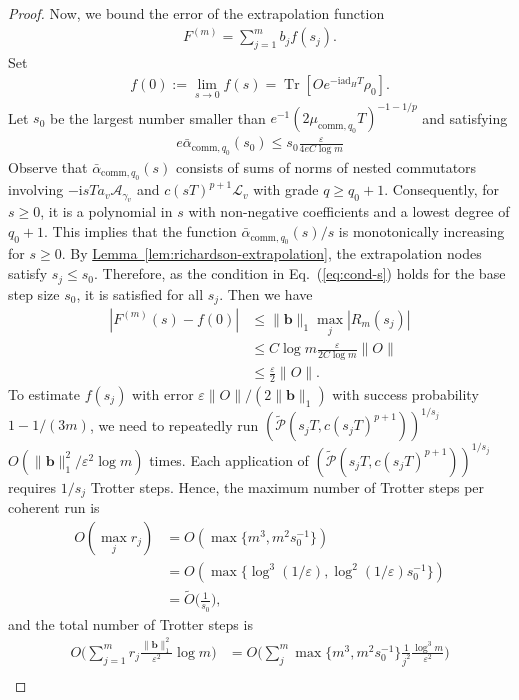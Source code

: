 \documentclass[aps,pra,reprint,groupedaddress,floatfix]{revtex4-2}
\newcommand{\eq}[1]{(\ref{eq:#1})}
\newcommand{\lem}[1]{\hyperref[lem:#1]{Lemma~\ref*{lem:#1}}}
\renewcommand{\i}{\mathrm{i}}
\newcommand{\ad}{\mathrm{ad}}
\newcommand{\eps}{\varepsilon}
\newcommand{\mc}{\mathcal}
\begin{document}
\begin{proof}
    Now, we bound the error of the extrapolation function \begin{align*}
        F^{(m)} = \sum_{j=1}^m b_j f(s_j).
    \end{align*}
    Set \begin{align*}
        f(0) :=\lim_{s\to 0} f(s) = \operatorname{Tr}[Oe^{-\i \ad_H T}\rho_0].
    \end{align*} Let $s_0$ be the largest number smaller than $e^{-1}(2\mu_{\mathrm{comm},q_0}T)^{-1-1/p}$ and satisfying \begin{align*}
        e\bar\alpha_{\mathrm{comm},q_0}(s_0)\le s_0\frac{\eps}{4eC \log m}
    \end{align*}
    Observe that $\bar\alpha_{\mathrm{comm}, q_0}(s)$ consists of sums of norms of nested commutators involving $-\i sT a_v \mc{A}_{\gamma_v}$ and $c(sT)^{p+1} \mc L_{v}$ with grade $q \ge q_0+1$. Consequently, for $s \ge 0$, it is a polynomial in $s$ with non-negative coefficients and a lowest degree of $q_0+1$. This implies that the function $\bar\alpha_{\mathrm{comm}, q_0}(s)/s$ is monotonically increasing for $s \ge 0$. 
    By \lem{richardson-extrapolation}, the extrapolation nodes satisfy $s_j \le s_0$. Therefore, as the condition in Eq.~\eq{cond-s} holds for the base step size $s_0$, it is satisfied for all $s_j$.
    Then we have \begin{align*}
        |F^{(m)}(s)-f(0)|&\le \|\mathbf{b}\|_1 \max_j|R_m(s_j)| \\
        &\le C\log m\frac{\eps}{2C\log m}\|O\|\\
        &\le \frac{\eps }{2}\|O\|.
    \end{align*}
    To estimate $f(s_j)$ with error $\eps\|O\|/(2\|\mathbf{b}\|_1)$ with success probability $1-1/(3m)$, we need to repeatedly run $(\tilde{\mc P}(s_jT, c(s_jT)^{p+1}))^{1/s_j}$ $O(\|\mathbf{b}\|_1^2/\eps^2\log m)$ times.  Each application of $(\tilde{\mc P}(s_jT, c(s_jT)^{p+1}))^{1/s_j}$ requires $1/s_j$ Trotter steps. Hence, the maximum number of Trotter steps per coherent run is \begin{align*}
        O(\max_j r_j) & = O( \max\{m^3, m^2s_0^{-1}\})\\
        &=O( \max\{\log^3(1/\eps), \log^2(1/\eps)s_0^{-1}\}) \\
        &= \widetilde{O}\Big(\frac{1}{s_0}\Big),
    \end{align*} and the total number of Trotter steps is \begin{align*}
        O\Big(\sum_{j=1}^m r_j\frac{\|\mathbf{b}\|_1^2}{\eps^2}\log m\Big) & = O\Big(\sum_j^{m} \max\{m^3, m^2s_0^{-1}\}\frac{1}{j^2}\frac{\log^3 m}{\eps^2}\Big)\\

\end{align*}
\end{proof}
\end{document}
